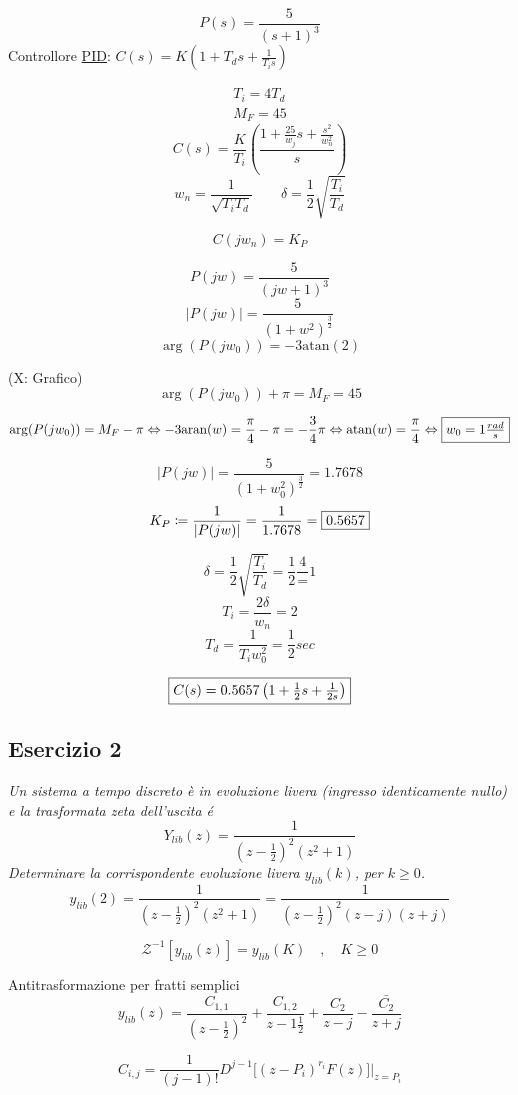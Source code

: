\documentclass{article}
\begin{document}
\[ P(s) = \frac{5}{(s+1)^3} \]
Controllore \underline{PID}: $ C(s) = K\left(1 + T_d s + \frac{1}{T_i s}\right)$

\[
\begin{split}
    T_i = 4T_d\\
    M_F = 45
\end{split}
\]
\[ C(s) = \frac{K}{T_i}\left( \frac{1 + \frac{25}{w_j}s + \frac{s^2}{w_n^2}}{s}\right)\]
\[ w_n = \frac{1}{\sqrt{T_iT_d}} \qquad \delta = \frac{1}{2}\sqrt{\frac{T_i}{T_d}} \]

\[ C(jw_n) = K_P \]

\[ P(jw) = \frac{5}{(jw+1)^3} \]
\[ |P(jw)| = \frac{5}{(1 + w^2) ^{\frac{3}{2}}} \]
\[ \arg(P(jw_0)) = -3 \text{atan}(2) \]

%
(X: Grafico)
\[ \arg(P(jw_0)) + \pi = M_F = 45 \]

\[ \arg(P(jw_0)) = M_F - \pi \Leftrightarrow -3 \text{aran}(w) = \frac{\pi}{4} - \pi = -\frac{3}{4}\pi \Leftrightarrow \text{atan}(w) = \frac{\pi}{4} \Leftrightarrow \framebox{$w_0 = 1 \frac{rad}{s}$}\]

\[ |P(jw)| = \frac{5}{(1 + w_0^2)^{\frac{3}{2}}} = 1.7678 \]
\[ K_P \coloneqq \frac{1}{|P(jw)|} = \frac{1}{1.7678} = \framebox{$0.5657$} \]

\[ \delta = \frac{1}{2}\sqrt{\frac{T_i}{T_d}} = \frac{1}{2}\frac{4} = 1 \]
\[ T_i = \frac{2\delta}{w_n} = 2 \]
\[ T_d = \frac{1}{T_i w_0^2} = \frac{1}{2} sec \]

\[\framebox{$C(s) = 0.5657 \left( 1 + \frac{1}{2}s + \frac{1}{2s}\right) $}\]

\subsection{Esercizio 2}
\textit{Un sistema a tempo discreto \`e in evoluzione livera (ingresso identicamente nullo) e la trasformata zeta dell'uscita \'e
    \[ Y_{lib}(z) = \frac{1}{\left(z -\frac{1}{2}\right)^2(z^2+1)} \]
Determinare la corrispondente evoluzione livera $y_{lib}(k)$, per $k \ge 0$.}
\bigbreak
\[ y_{lib}(2) = \frac{1}{(z - \frac{1}{2}) ^2 (z^2 + 1)}  = \frac{1}{\left(z - \frac{1}{2}\right)^2(z -j)(z + j)} \]

\[ \mathcal{Z}^{-1}[ y_{lib}(z)] = y_{lib}(K) \quad , \quad K \ge 0 \]

Antitrasformazione per fratti semplici
\[ y_{lib}(z) = \frac{C_{1, 1}}{\left( z - \frac{1}{2}\right)^2} + \frac{C_{1, 2}}{z - 1\frac{1}{2}} + \frac{C_2}{z - j} - \frac{\bar{C_2}}{z+j} \]

\[ C_{i, j} = \frac{1}{(j-1)!} D^{j-1}\big[ (z-P_i)^{r_i} F(z)\big]\big|_{z=P_i} \]
\end{document}
